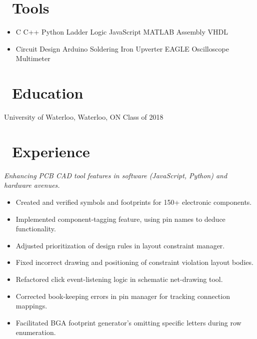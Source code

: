 \documentclass{resume}
\begin{document}



\section{\faWrench\ Tools}

\begin{itemize}[parsep=0.5ex]
  \item %
  C\textperiodcentered 
  C++\textperiodcentered
  Python\textperiodcentered
  Ladder Logic\textperiodcentered
  JavaScript\textperiodcentered
  MATLAB\textperiodcentered
  Assembly\textperiodcentered
  VHDL
  \item %
  Circuit Design\textperiodcentered
  Arduino\textperiodcentered
  Soldering Iron\textperiodcentered
  Upverter\textperiodcentered
  EAGLE\textperiodcentered
  Oscilloscope\textperiodcentered
  Multimeter
\end{itemize}
\nspace{}

\section{\faGraduationCap\ Education}

University of Waterloo, Waterloo, ON \hfill Class of 2018\par 
\nspace{}

\section{\faLineChart\ Experience}

\textit{Enhancing PCB CAD tool features in software (JavaScript, Python) and hardware avenues.}
\begin{itemize}
  \item Created and verified symbols and footprints for 150+ electronic components.
  \item Implemented component-tagging feature, using pin names to deduce functionality.
  \item Adjusted prioritization of design rules in layout constraint manager.
  \item Fixed incorrect drawing and positioning of constraint violation layout bodies.
  \item Refactored click event-listening logic in schematic net-drawing tool.
  \item Corrected book-keeping errors in pin manager for tracking connection mappings.
  \item Facilitated BGA footprint generator's omitting specific letters during row enumeration.
\end{itemize}
\nspacen{}
\end{document}
